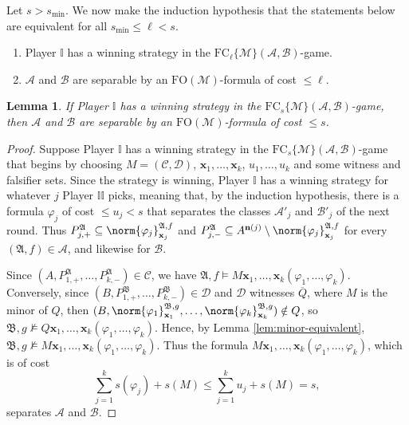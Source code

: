 \documentclass{article}
\newtheorem{lemma}[theorem]{Lemma}
\theoremstyle{definition}
\begin{document}
Let $s>s_{\min}$. We now make the induction hypothesis that the statements below are equivalent for all $s_{\min}\leq\ell < s$.
\begin{enumerate}
    \item Player $\mathbb{I}$ has a winning strategy in the $\mathrm{FC}_\ell\{\mathcal{M}\}(\mathcal{A},\mathcal{B})$-game.
    \item $\mathcal{A}$ and $\mathcal{B}$ are separable by an $\mathrm{FO}(\mathcal{M})$-formula of cost $\leq \ell$.
\end{enumerate}

\begin{lemma}\label{lem:minor-win-implies-separability}
    If Player $\mathbb{I}$ has a winning strategy in the $\mathrm{FC}_s\{\mathcal{M}\}(\mathcal{A},\mathcal{B})$-game, then $\mathcal{A}$ and $\mathcal{B}$ are separable by an $\mathrm{FO}(\mathcal{M})$-formula of cost $\leq s$.
\end{lemma}
\begin{proof}
    Suppose Player $\mathbb{I}$ has a winning strategy in the $\mathrm{FC}_s\{\mathcal{M}\}(\mathcal{A},\mathcal{B})$-game that begins by choosing $M=(\mathcal{C},\mathcal{D})$, $\textbf{x}_1,\dots,\textbf{x}_k$, $u_1,\dots,u_k$ and some witness and falsifier sets. Since the strategy is winning, Player $\mathbb{I}$ has a winning strategy for whatever $j$ Player $\mathbb{II}$ picks, meaning that, by the induction hypothesis, there is a formula $\varphi_j$ of cost $\leq u_j<s$ that separates the classes $\mathcal{A}'_j$ and $\mathcal{B}'_j$ of the next round. Thus $P^\mathfrak{A}_{j,+}\subseteq \norm{\varphi_j}^{\mathfrak{A},f}_{\textbf{x}_j}$ and $P^\mathfrak{A}_{j,-}\subseteq A^{\textbf{n}(j)}\setminus \norm{\varphi_j}^{\mathfrak{A},f}_{\textbf{x}_j}$ for every $(\mathfrak{A},f)\in \mathcal{A}$, and likewise for $\mathcal{B}$.
    
    Since $(A,P^\mathfrak{A}_{1,+},\dots,P^\mathfrak{A}_{k,-})\in \mathcal{C}$, we have $\mathfrak{A},f\models M\textbf{x}_1,\dots,\textbf{x}_k(\varphi_1,\dots,\varphi_k)$. Conversely, since $(B,P^\mathfrak{B}_{1,+},\dots,P^\mathfrak{B}_{k,-})\in \mathcal{D}$ and $\mathcal{D}$ witnesses $\overline{Q}$, where $M$ is the minor of $Q$, then $(B,\norm{\varphi_1}^{\mathfrak{B},g}_{\textbf{x}_1},\dots,\norm{\varphi_k}^{\mathfrak{B},g}_{\textbf{x}_k})\notin Q$, so $\mathfrak{B},g\not\models Q\textbf{x}_1,\dots,\textbf{x}_k(\varphi_1,\dots,\varphi_k)$. Hence, by Lemma \ref{lem:minor-equivalent}, $\mathfrak{B},g\not\models M\textbf{x}_1,\dots,\textbf{x}_k(\varphi_1,\dots,\varphi_k)$. Thus the formula $ M\textbf{x}_1,\dots,\textbf{x}_k(\varphi_1,\dots,\varphi_k)$, which is of cost
    \[
        \sum_{j=1}^k s(\varphi_j)+s(M)\leq \sum_{j=1}^k u_j+s(M)=s,
    \]
    separates $\mathcal{A}$ and $\mathcal{B}$.
\end{proof}
\end{document}
